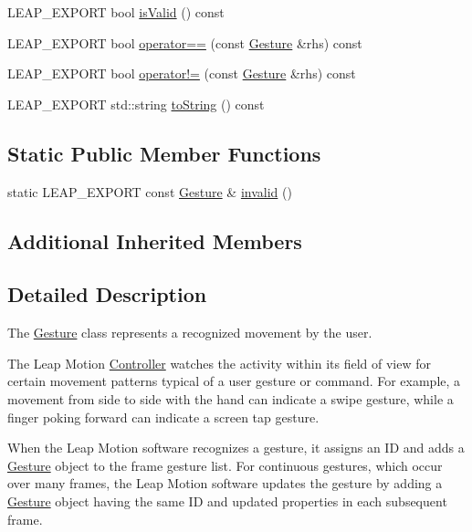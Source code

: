 \begin{DoxyCompactItemize}
\item 
L\+E\+A\+P\+\_\+\+E\+X\+P\+O\+R\+T bool \hyperlink{class_leap_1_1_gesture_afc32b33f86e676ef854d5298be4f56bd}{is\+Valid} () const 
\item 
L\+E\+A\+P\+\_\+\+E\+X\+P\+O\+R\+T bool \hyperlink{class_leap_1_1_gesture_a13725877525e73592601bd85091cdccb}{operator==} (const \hyperlink{class_leap_1_1_gesture}{Gesture} \&rhs) const 
\item 
L\+E\+A\+P\+\_\+\+E\+X\+P\+O\+R\+T bool \hyperlink{class_leap_1_1_gesture_a795392baacac8bba8661d9487727e547}{operator!=} (const \hyperlink{class_leap_1_1_gesture}{Gesture} \&rhs) const 
\item 
L\+E\+A\+P\+\_\+\+E\+X\+P\+O\+R\+T std\+::string \hyperlink{class_leap_1_1_gesture_a00a3b12d834ce58c004282076cc3ea72}{to\+String} () const 
\end{DoxyCompactItemize}
\subsection*{Static Public Member Functions}
\begin{DoxyCompactItemize}
\item 
static L\+E\+A\+P\+\_\+\+E\+X\+P\+O\+R\+T const \hyperlink{class_leap_1_1_gesture}{Gesture} \& \hyperlink{class_leap_1_1_gesture_a76cbf3abfeb8c1b4fb6faed4483bb185}{invalid} ()
\end{DoxyCompactItemize}
\subsection*{Additional Inherited Members}


\subsection{Detailed Description}
The \hyperlink{class_leap_1_1_gesture}{Gesture} class represents a recognized movement by the user.

The Leap Motion \hyperlink{class_leap_1_1_controller}{Controller} watches the activity within its field of view for certain movement patterns typical of a user gesture or command. For example, a movement from side to side with the hand can indicate a swipe gesture, while a finger poking forward can indicate a screen tap gesture.

When the Leap Motion software recognizes a gesture, it assigns an I\+D and adds a \hyperlink{class_leap_1_1_gesture}{Gesture} object to the frame gesture list. For continuous gestures, which occur over many frames, the Leap Motion software updates the gesture by adding a \hyperlink{class_leap_1_1_gesture}{Gesture} object having the same I\+D and updated properties in each subsequent frame.

